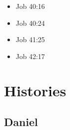 \documentclass[14pt]{book}
\begin{document}
\begin{multicols}{2}
\begin{itemize}
															\item Job 40:16
															
															\item Job 40:24
															
															\item Job 41:25
															
															\item Job 42:17
															
														\end{itemize}\end{multicols}

\section{Histories}

\subsection{Daniel}
\end{document}
